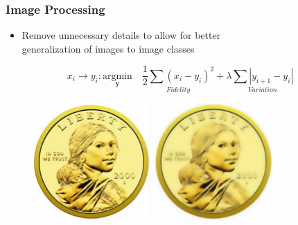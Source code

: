 \documentclass[xcolor={dvipsnames}]{beamer}
\begin{document}
\frame
{
 \frametitle{Image Processing}
 
\begin{itemize}
\item Remove unnecessary details to allow for better\\
generalization of images to image classes\\
\end{itemize}

$$ x_i \rightarrow y_i : \underset{\boldsymbol y}{\text{argmin}} \quad \underset{Fidelity}{\frac{1}{2}\sum(x_i -y_i)^2} + \lambda \underset{Variation}{\sum |y_{i+1}-y_i|}$$

\begin{figure}
\centering
{\includegraphics[width=1.75in]{stuff/dn1.png}}$\;\;${\includegraphics[width=1.75in]{stuff/dn2.png}}
\end{figure}

}
\end{document}
